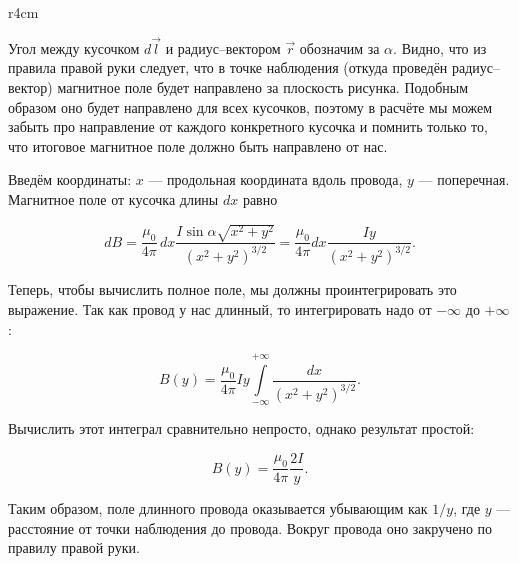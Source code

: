 \documentclass[a4paper,12pt]{article}
\begin{document}
\begin{wrapfigure}{r}{4cm}
\centering
{}
\label{fig:current_wire}
\end{wrapfigure}

Угол между кусочком $d\vec{l}$ и радиус--вектором $\vec{r}$ обозначим
за $\alpha$. Видно, что из правила правой руки следует, что в точке
наблюдения (откуда проведён радиус--вектор) магнитное поле будет
направлено за плоскость рисунка. Подобным образом оно будет направлено
для всех кусочков, поэтому в расчёте мы можем забыть про направление
от каждого конкретного кусочка и помнить только то, что итоговое
магнитное поле должно быть направлено от нас. 

Введём координаты: $x$ --- продольная координата вдоль провода,
$y$ --- поперечная. Магнитное поле от кусочка длины $dx$ равно

\begin{equation}
  \label{eq:wire_current_1}
  dB = \frac{\mu_{0}}{4\pi}\,dx \frac{I \sin \alpha
    \sqrt{x^2+y^2}}{\left(x^2+y^2\right)^{3/2}} = \frac{\mu_0}{4\pi} dx \frac{I
  y}{\left(x^2+y^2\right)^{3/2}}.
\end{equation}

Теперь, чтобы вычислить полное поле, мы должны проинтегрировать это
выражение. Так как провод у нас длинный, то интегрировать надо от
$-\infty$ до $+\infty$: 

\begin{equation}
  \label{eq:wire_current_2}
  B(y) = \frac{\mu_0}{4\pi} Iy \int\limits_{-\infty}^{+\infty} \frac{dx}{\left(x^2+y^2\right)^{3/2}} .
\end{equation}

Вычислить этот интеграл сравнительно непросто, однако результат простой: 

\begin{equation}
  \label{eq:wire_current_3}
  B(y) = \frac{\mu_0}{4\pi} \frac{2I}{y}.
\end{equation}

Таким образом, поле длинного провода оказывается убывающим как $1/y$,
где $y$ --- расстояние от точки наблюдения до провода. Вокруг провода
оно закручено по правилу правой руки. 
\end{document}
